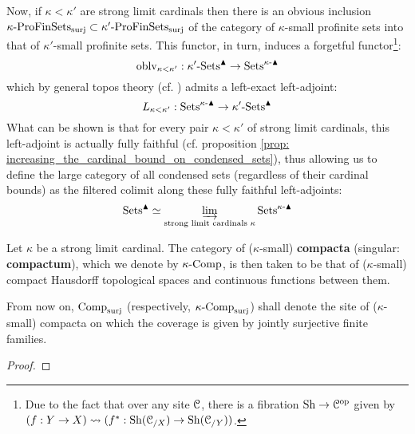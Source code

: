 \begin{remark}
                Now, if $\kappa < \kappa'$ are strong limit cardinals then there is an obvious inclusion $\kappa\text{-}\mathrm{Pro}\mathrm{Fin}\mathrm{Sets}_{\mathrm{surj}} \subset \kappa'\text{-}\mathrm{Pro}\mathrm{Fin}\mathrm{Sets}_{\mathrm{surj}}$ of the category of $\kappa$-small profinite sets into that of $\kappa'$-small profinite sets. This functor, in turn, induces a forgetful functor\footnote{Due to the fact that over any site $\mathcal{C}$, there is a fibration $\mathrm{Sh} \to \mathcal{C}^{\mathrm{op}}$ given by $(f: Y \to X) \leadsto (f^*: \mathrm{Sh}({\mathcal{C}_{/X}}) \to \mathrm{Sh}(\mathcal{C}_{/Y}))$.}:
                    $$\mathrm{oblv}_{\kappa < \kappa'}: \kappa'\text{-}\mathrm{Sets}^{\blacktriangle} \to \mathrm{Sets}^{\kappa\text{-}\blacktriangle}$$
                which by general topos theory (cf. \cite[Expos\'e IV]{sga4}) admits a left-exact left-adjoint:
                    $$L_{\kappa < \kappa'}: \mathrm{Sets}^{\kappa\text{-}\blacktriangle} \to \kappa'\text{-}\mathrm{Sets}^{\blacktriangle}$$
                What can be shown is that for every pair $\kappa < \kappa'$ of strong limit cardinals, this left-adjoint is actually fully faithful (cf. proposition \ref{prop: increasing_the_cardinal_bound_on_condensed_sets}), thus allowing us to define the large category of all condensed sets (regardless of their cardinal bounds) as the filtered colimit along these fully faithful left-adjoints:
                    $$\mathrm{Sets}^{\blacktriangle} \simeq \varinjlim_{ \text{strong limit cardinals $\kappa$} } \mathrm{Sets}^{\kappa\text{-}\blacktriangle}$$
            \end{remark}
            \begin{definition}[Compacta] \label{def: compacta}
                Let $\kappa$ be a strong limit cardinal. The category of ($\kappa$-small) \textbf{compacta} (singular: \textbf{compactum}), which we denote by $\kappa\text{-}\mathrm{Comp}$, is then taken to be that of ($\kappa$-small) compact Hausdorff topological spaces and continuous functions between them. 
            \end{definition}
            \begin{convention} \label{conv: site_of_compacta}
                From now on, $\mathrm{Comp}_{\mathrm{surj}}$ (respectively, $\kappa\text{-}\mathrm{Comp}_{\mathrm{surj}}$) shall denote the site of ($\kappa$-small) compacta on which the coverage is given by jointly surjective finite families.
            \end{convention}
            \begin{lemma}
                
            \end{lemma}
                \begin{proof}
                    
                \end{proof}
